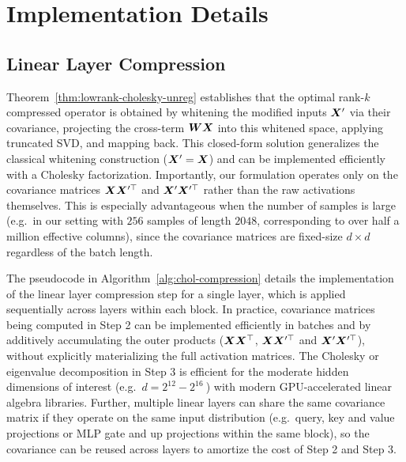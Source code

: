 \documentclass[10pt]{article} %
\theoremstyle{definition}
\theoremstyle{remark}
\begin{document}
\section{Implementation Details}
\label{sec:appendix_implementation}

\subsection{Linear Layer Compression}
\label{sec:appendix_linear}

Theorem~\ref{thm:lowrank-cholesky-unreg} establishes that the optimal
rank-$k$ compressed operator is obtained by whitening the modified
inputs ${\bm{X}}'$ via their covariance, projecting the cross-term ${\bm{W}}{\bm{X}}$ into
this whitened space, applying truncated SVD, and mapping back. This
closed-form solution generalizes the classical whitening construction
(${\bm{X}}'={\bm{X}}$) and can be implemented efficiently with a Cholesky
factorization. Importantly, our formulation operates only on the
covariance matrices ${\bm{X}}{\bm{X}}'^{\top}$ and ${\bm{X}}'{\bm{X}}'^{\top}$ rather than the raw
activations themselves. This is especially advantageous when the number
of samples is large (e.g.\ in our setting with $256$ samples of length
$2048$, corresponding to over half a million effective columns), since
the covariance matrices are fixed-size $d\times d$ regardless of the
batch length.

The pseudocode in Algorithm~\ref{alg:chol-compression} details the 
implementation of the linear layer compression step for a single layer, 
which is applied sequentially across layers within each block. In practice,
covariance matrices being computed in Step 2 can be implemented efficiently
in batches and by additively accumulating the outer products (${\bm{X}}{\bm{X}}^{\top}$, ${\bm{X}}{\bm{X}}'^{\top}$ and ${\bm{X}}'{\bm{X}}'^{\top}$), 
without explicitly materializing the full activation matrices. 
The Cholesky or eigenvalue decomposition in Step 3 is efficient for the moderate hidden 
dimensions of interest (e.g.\ $d=2^{12}-2^{16}~$) with modern GPU-accelerated linear algebra libraries. 
Further, multiple linear layers can share the same covariance matrix if they operate on the same input distribution (e.g.\ query,  key and value projections or MLP gate and up projections within the same block), so the covariance can be reused across layers to amortize the cost of Step 2 and Step 3.
\end{document}
